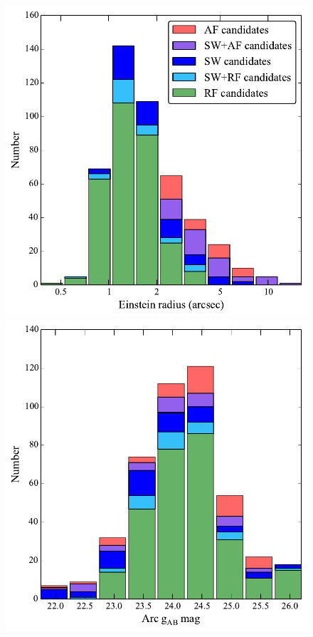 \documentclass[useAMS,usenatbib,a4paper]{mn2e}
\begin{document}

\begin{figure}
\begin{center}
\includegraphics[scale=0.5]{sw-cfhtls-figs/stacked_lenscand_rein.pdf}
\includegraphics[scale=0.5]{sw-cfhtls-figs/stacked_lenscand_mag.pdf}

\end{center}
\end{figure}
\end{document}
